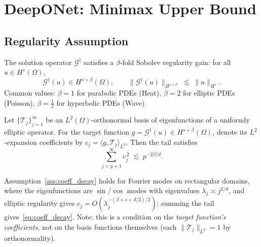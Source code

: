 \documentclass[12pt,a4paper]{article}
\begin{document}
\section{DeepONet: Minimax Upper Bound}
\label{sec:deeponet}

\subsection{Regularity Assumption}

\begin{assump}
    \label{ass:regularity}
    The solution operator $\mathcal{G}^\dagger$ satisfies a $\beta$-fold
    Sobolev regularity gain: for all $u \in H^s(\Omega)$,
    \begin{equation}
        \mathcal{G}^\dagger(u) \in H^{s+\beta}(\Omega),
        \qquad
        \|\mathcal{G}^\dagger(u)\|_{H^{s+\beta}}
        \;\lesssim\;
        \|u\|_{H^s}.
    \end{equation}
    Common values: $\beta=1$ for parabolic PDEs (Heat), $\beta=2$ for
    elliptic PDEs (Poisson), $\beta=\tfrac12$ for hyperbolic PDEs (Wave).
\end{assump}

\begin{assump}
    \label{ass:coeff_decay}
    Let $\{\mathcal{T}_j\}_{j=1}^\infty$ be an $L^2(\Omega)$-orthonormal basis
    of eigenfunctions of a uniformly elliptic operator.
    For the target function $g = \mathcal{G}^\dagger(u) \in H^{s+\beta}(\Omega)$,
    denote its $L^2$-expansion coefficients by
    $c_j = \langle g, \mathcal{T}_j \rangle_{L^2}$.
    Then the tail satisfies
    \begin{equation}
        \sum_{j=p+1}^\infty c_j^{\,2}
        \;\lesssim\; p^{-2\beta/d}.
        \label{eq:coeff_decay}
    \end{equation}
\end{assump}

Assumption~\ref{ass:coeff_decay} holds for Fourier modes on rectangular domains,
where the eigenfunctions are $\sin/\cos$ modes with eigenvalues
$\lambda_j \asymp j^{2/d}$, and elliptic regularity gives
$c_j = O(\lambda_j^{-(\beta+s+d/2)/2})$;
summing the tail gives~\eqref{eq:coeff_decay}.
Note: this is a condition on the \emph{target function's coefficients},
not on the basis functions themselves (each $\|\mathcal{T}_j\|_{L^2}=1$ by orthonormality).
\end{document}
